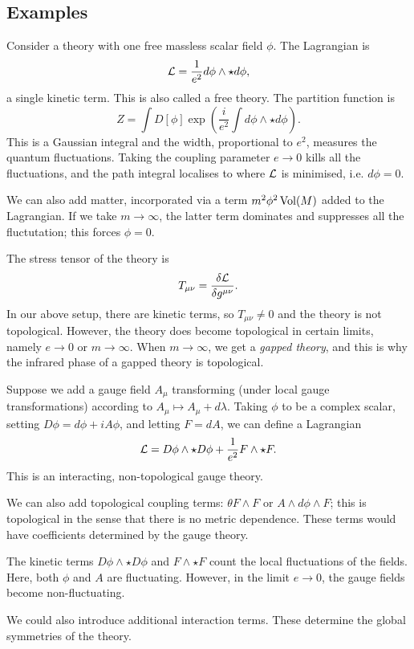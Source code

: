\subsection{Examples}

Consider a theory with one free massless scalar field $\phi$.
The Lagrangian is
\[
	\mathcal{L} = \frac{1}{e^2} d \phi \wedge \star d \phi,
\]
a single kinetic term. This is also called a free theory.
The partition function is
\[
	Z = \int D[\phi] \exp\left( \frac{i}{e^2} \int d\phi \wedge \star d\phi \right).
\]
This is a Gaussian integral and the width, proportional to $e^2$, measures the quantum fluctuations. Taking the coupling parameter $e \to 0$ kills all the fluctuations, and the path integral localises to where $\mathcal{L}$ is minimised, i.e. $d\phi = 0$.

We can also add matter, incorporated via a term $m^2 \phi^2 \operatorname{Vol}(M)$ added to the Lagrangian.
If we take $m \to \infty$, the latter term dominates and suppresses all the fluctutation; this forces $\phi = 0$.

The stress tensor of the theory is
\[
	T_{\mu\nu} = \frac{\delta \mathcal{L}}{\delta g^{\mu\nu}}.
\]
In our above setup, there are kinetic terms, so $T_{\mu\nu} \neq 0$ and the theory is not topological.
However, the theory does become topological in certain limits, namely $e \to 0$ or $m \to \infty$. When $m \to \infty$, we get a \emph{gapped theory}, and this is why the infrared phase of a gapped theory is topological.

Suppose we add a gauge field $A_\mu$ transforming (under local gauge transformations) according to $A_\mu \mapsto A_\mu + d\lambda$.
Taking $\phi$ to be a complex scalar, setting $D\phi = d\phi + i A \phi$, and letting $F = dA$, we can define a Lagrangian
\[
	\mathcal{L} = D \phi \wedge \star D\phi + \frac{1}{e^2} F \wedge \star F.
\]
This is an interacting, non-topological gauge theory.

We can also add topological coupling terms: $\theta F \wedge F$ or $A \wedge d\phi \wedge F$; this is topological in the sense that there is no metric dependence.
These terms would have coefficients determined by the gauge theory.

The kinetic terms $D \phi \wedge \star D \phi$ and $F \wedge \star F$ count the local fluctuations of the fields. Here, both $\phi$ and $A$ are fluctuating. However, in the limit $e \to 0$, the gauge fields become non-fluctuating.

We could also introduce additional interaction terms. These determine the global symmetries of the theory.

